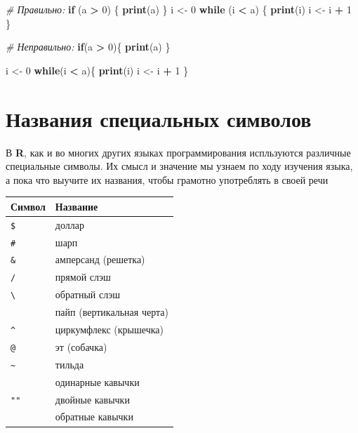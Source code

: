 \documentclass[]{book}
\newenvironment{Shaded}{\begin{snugshade}}{\end{snugshade}}
\newcommand{\KeywordTok}[1]{\textcolor[rgb]{0.13,0.29,0.53}{\textbf{#1}}}
\newcommand{\DecValTok}[1]{\textcolor[rgb]{0.00,0.00,0.81}{#1}}
\newcommand{\StringTok}[1]{\textcolor[rgb]{0.31,0.60,0.02}{#1}}
\newcommand{\CommentTok}[1]{\textcolor[rgb]{0.56,0.35,0.01}{\textit{#1}}}
\newcommand{\ControlFlowTok}[1]{\textcolor[rgb]{0.13,0.29,0.53}{\textbf{#1}}}
\newcommand{\OperatorTok}[1]{\textcolor[rgb]{0.81,0.36,0.00}{\textbf{#1}}}
\newcommand{\NormalTok}[1]{#1}
\begin{document}
\begin{Shaded}
\begin{Highlighting}[]
\CommentTok{# Правильно:}
\ControlFlowTok{if}\NormalTok{ (a }\OperatorTok{>}\StringTok{ }\DecValTok{0}\NormalTok{) \{}
  \KeywordTok{print}\NormalTok{(a)}
\NormalTok{\}}
\NormalTok{i <-}\StringTok{ }\DecValTok{0}
\ControlFlowTok{while}\NormalTok{ (i }\OperatorTok{<}\StringTok{ }\NormalTok{a) \{}
  \KeywordTok{print}\NormalTok{(i)}
\NormalTok{  i <-}\StringTok{ }\NormalTok{i }\OperatorTok{+}\StringTok{ }\DecValTok{1}
\NormalTok{\}}

\CommentTok{# Неправильно:}
\ControlFlowTok{if}\NormalTok{(a }\OperatorTok{>}\StringTok{ }\DecValTok{0}\NormalTok{)\{}
  \KeywordTok{print}\NormalTok{(a)}
\NormalTok{\}}

\NormalTok{i <-}\StringTok{ }\DecValTok{0}
\ControlFlowTok{while}\NormalTok{(i }\OperatorTok{<}\StringTok{ }\NormalTok{a)\{}
  \KeywordTok{print}\NormalTok{(i)}
\NormalTok{  i <-}\StringTok{ }\NormalTok{i }\OperatorTok{+}\StringTok{ }\DecValTok{1}
\NormalTok{\}}
\end{Highlighting}
\end{Shaded}

\section*{Названия специальных символов}\label{--}

В \textbf{R}, как и во многих других языках программирования испльзуются
различные специальные символы. Их смысл и значение мы узнаем по ходу
изучения языка, а пока что выучите их названия, чтобы грамотно
употреблять в своей речи

\begin{longtable}[]{@{}ll@{}}
\toprule
Символ & Название\tabularnewline
\midrule
\endhead
\texttt{\$} & доллар\tabularnewline
\texttt{\#} & шарп\tabularnewline
\texttt{\&} & амперсанд (решетка)\tabularnewline
\texttt{/} & прямой слэш\tabularnewline
\texttt{\textbackslash{}} & обратный слэш\tabularnewline
\texttt{\textbar{}} & пайп (вертикальная черта)\tabularnewline
\texttt{\^{}} & циркумфлекс (крышечка)\tabularnewline
\texttt{@} & эт (собачка)\tabularnewline
\texttt{\textasciitilde{}} & тильда\tabularnewline
\texttt{\textquotesingle{}\textquotesingle{}} & одинарные
кавычки\tabularnewline
\texttt{""} & двойные кавычки\tabularnewline
\texttt{\textasciigrave{}\textasciigrave{}} & обратные
кавычки\tabularnewline
\bottomrule
\end{longtable}
\end{document}
